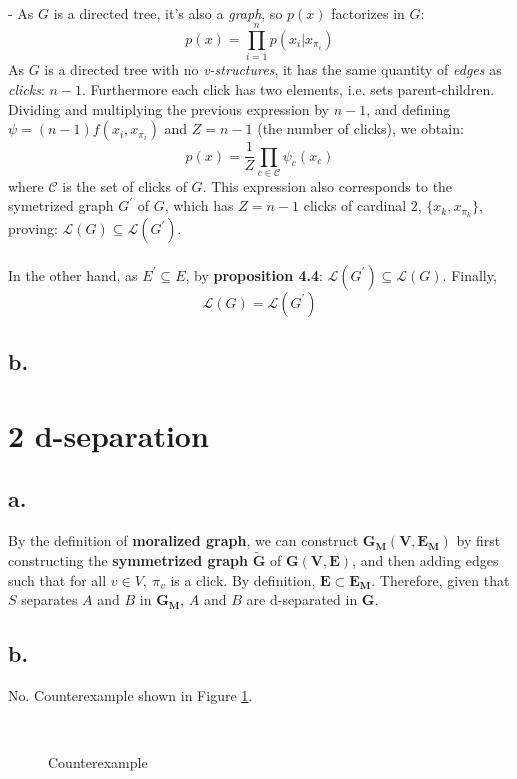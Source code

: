 \documentclass[12pt]{article}
\begin{document}
~\\
- As $G$ is a directed tree, it's also a \emph{graph}, so $p(x)$ factorizes in $G$:
$$p(x) = \prod^n_{i=1}p(x_i|x_{\pi_i})$$
As $G$ is a directed tree with no \emph{v-structures}, it has the same quantity of \emph{edges} as \emph{clicks}: $n-1$. Furthermore each click has two elements, i.e. sets parent-children. Dividing and multiplying the previous expression by $n-1$, and defining $\psi = (n-1)f(x_i,x_{\pi_i})$ and $Z=n-1$ (the number of clicks), we obtain:
$$p(x) = \frac{1}{Z}\prod_{c\in \mathcal{C}}\psi_c(x_c)$$
where $\mathcal{C}$ is the set of clicks of $G$. This expression also corresponds to the symetrized graph $G^\prime$ of $G$, which has $Z=n-1$ clicks of cardinal $2$, $\{x_k, x_{\pi_k}\}$, proving: $\mathcal{L}(G)\subseteq \mathcal{L}(G^\prime)$.
~\\
~\\
In the other hand, as $E^\prime \subseteq E$, by \textbf{proposition 4.4}: $\mathcal{L}(G^\prime)\subseteq \mathcal{L}(G)$.
Finally, $$\boxed{\mathcal{L}(G) = \mathcal{L}(G^\prime)}$$

\subsection*{b.}

\section*{2 d-separation}
\subsection*{a.}
By the definition of \textbf{moralized graph}, we can construct $\mathbf{G_M(V,E_M)}$ by first constructing the \textbf{symmetrized graph} $\mathbf{\tilde{G}}$ of $\mathbf{G(V,E)}$, and then adding edges such that for all $v\in V,\ \pi_v$ is a click. By definition, $\mathbf{E}\subset \mathbf{E_M}$. Therefore, given that $S$ separates $A$ and $B$ in $\mathbf{G_M}$, $A$ and $B$ are d-separated in $\mathbf{G}$.

\subsection*{b.}
No. Counterexample shown in Figure \ref{fig:ex2_dags}.
\begin{figure} [h!]
\centering
   \hfill 
   \\
  \caption{Counterexample}
  \label{fig:ex2_dags}
\end{figure}
\end{document}

